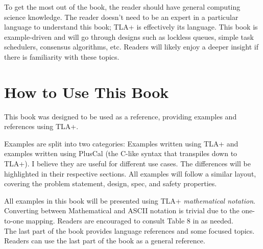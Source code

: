 To get the most out of the book, the reader should have general computing
science knowledge. The reader doesn't need to be an expert in a particular
language to understand this book; TLA+ is effectively its language. This book is
example-driven and will go through designs such as lockless queues, simple
task schedulers, consensus algorithms, etc. Readers will likely enjoy a deeper
insight if there is familiarity with these topics.

\section{How to Use This Book}

This book was designed to be used as a reference, providing examples
and references using TLA+.\newline

Examples are split into two categories: Examples written using TLA+ and
examples written using PlusCal (the C-like syntax that transpiles down to TLA+).
I believe they are useful for different use cases. The differences will
be highlighted in their respective sections. All examples will follow a
similar layout, covering the problem statement, design, spec, and safety
properties.\newline

All examples in this book will be presented using TLA+ \textit{mathematical
notation}. Converting between Mathematical and ASCII notation is trivial due to
the one-to-one mapping. Readers are encouraged to consult Table 8 in \cite{ss}
as needed.\\

The last part of the book provides language references and some focused topics.
Readers can use the last part of the book as a general reference. 
